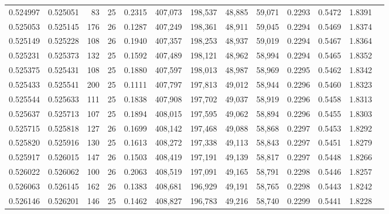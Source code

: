 \begin{tabular}{rrrrrrrrrrrrr}
0.524997 & 0.525051 &  83 &  25 &                                     0.2315 & 407,073 & 198,537 &  48,885 &  59,071 & 0.2293 & 0.5472 & 1.8391 \\
0.525053 & 0.525145 & 176 &  26 &                                     0.1287 & 407,249 & 198,361 &  48,911 &  59,045 & 0.2294 & 0.5469 & 1.8374 \\
0.525149 & 0.525228 & 108 &  26 &                                     0.1940 & 407,357 & 198,253 &  48,937 &  59,019 & 0.2294 & 0.5467 & 1.8364 \\
0.525231 & 0.525373 & 132 &  25 &                                     0.1592 & 407,489 & 198,121 &  48,962 &  58,994 & 0.2294 & 0.5465 & 1.8352 \\
0.525375 & 0.525431 & 108 &  25 &                                     0.1880 & 407,597 & 198,013 &  48,987 &  58,969 & 0.2295 & 0.5462 & 1.8342 \\
0.525433 & 0.525541 & 200 &  25 &                                     0.1111 & 407,797 & 197,813 &  49,012 &  58,944 & 0.2296 & 0.5460 & 1.8323 \\
0.525544 & 0.525633 & 111 &  25 &                                     0.1838 & 407,908 & 197,702 &  49,037 &  58,919 & 0.2296 & 0.5458 & 1.8313 \\
0.525637 & 0.525713 & 107 &  25 &                                     0.1894 & 408,015 & 197,595 &  49,062 &  58,894 & 0.2296 & 0.5455 & 1.8303 \\
0.525715 & 0.525818 & 127 &  26 &                                     0.1699 & 408,142 & 197,468 &  49,088 &  58,868 & 0.2297 & 0.5453 & 1.8292 \\
0.525820 & 0.525916 & 130 &  25 &                                     0.1613 & 408,272 & 197,338 &  49,113 &  58,843 & 0.2297 & 0.5451 & 1.8279 \\
0.525917 & 0.526015 & 147 &  26 &                                     0.1503 & 408,419 & 197,191 &  49,139 &  58,817 & 0.2297 & 0.5448 & 1.8266 \\
0.526022 & 0.526062 & 100 &  26 &                                     0.2063 & 408,519 & 197,091 &  49,165 &  58,791 & 0.2298 & 0.5446 & 1.8257 \\
0.526063 & 0.526145 & 162 &  26 &                                     0.1383 & 408,681 & 196,929 &  49,191 &  58,765 & 0.2298 & 0.5443 & 1.8242 \\
0.526146 & 0.526201 & 146 &  25 &                                     0.1462 & 408,827 & 196,783 &  49,216 &  58,740 & 0.2299 & 0.5441 & 1.8228 \\

\end{tabular}
